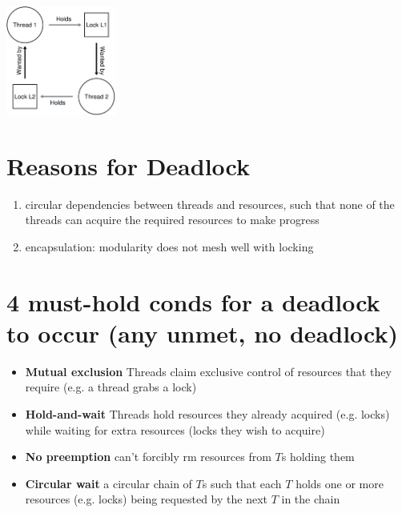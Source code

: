 \begin{minipage}{0.5\linewidth}
  \includegraphics[width=\linewidth,height=3.6cm]{imgs/deadlocks1}
\end{minipage}
\section*{Reasons for Deadlock}
\begin{enumerate}
\item circular dependencies between threads and resources, such that none of the threads can acquire the required resources to make progress
\item encapsulation: modularity does not mesh well with locking
\end{enumerate}
\section*{4 must-hold conds for a deadlock to occur (any unmet, no deadlock)}
\begin{itemize}
\item \textbf{Mutual exclusion} Threads claim exclusive control of resources that they require (e.g. a thread grabs a lock)
\item \textbf{Hold-and-wait} Threads hold resources they already acquired (e.g. locks) while waiting for extra resources (locks they wish to acquire)
\item \textbf{No preemption} can't forcibly rm resources from $T$s holding them
\item \textbf{Circular wait} a circular chain of $T$s such that each $T$ holds one or more resources (e.g. locks) being requested by the next $T$ in the chain
\end{itemize}
